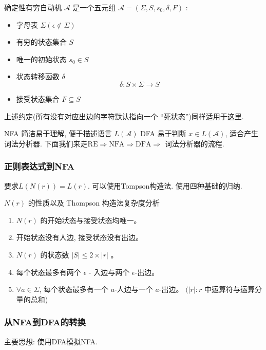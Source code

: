 \documentclass{ctexart}
\begin{document}
    \begin{definition}[DFA]
        确定性有穷自动机 $\mathcal{A}$ 是一个五元组 $\mathcal{A}=\left(\Sigma, S, s_0, \delta, F\right)$ :
        \begin{itemize}
            \item 字母表 $\Sigma(\epsilon \notin \Sigma)$
            \item 有穷的状态集合 $S$
            \item 唯一的初始状态 $s_0 \in S$
            \item 状态转移函数 $\delta$ 
            $$
            \delta: S \times \Sigma \rightarrow S
            $$
            \item 接受状态集合 $F \subseteq S$
        \end{itemize} 
        
    \end{definition}

    上述约定(所有没有对应出边的字符默认指向一个 “死状态”)同样适用于这里. 

    NFA 简洁易于理解, 便于描述语言 $L(\mathcal{A})$ DFA 易于判断 $x \in L(\mathcal{A})$, 适合产生词法分析器. 下面我们来走$\mathrm{RE} \Longrightarrow \mathrm{NFA} \Longrightarrow \mathrm{DFA} \Longrightarrow$ 词法分析器的流程. 

    \subsubsection{正则表达式到NFA}

    要求$L(N(r))=L(r)$. 可以使用Tompson构造法. 使用四种基础的归纳. 
        
    $N(r)$ 的性质以及 Thompson 构造法复杂度分析
\begin{enumerate}
    \item  $N(r)$ 的开始状态与接受状态均唯一。
    \item  开始状态没有人边, 接受状态没有出边。
    \item  $N(r)$ 的状态数 $|S| \leq 2 \times|r|$ 。
    \item  每个状态最多有两个 $\epsilon$ - 入边与两个 $\epsilon$-出边。
    \item  $\forall a \in \Sigma$, 每个状态最多有一个 $a$-人边与一个 $a$-出边。
    $(|r|: r$ 中运算符与运算分量的总和)
\end{enumerate}

\subsubsection{从NFA到DFA的转换} 主要思想: 使用DFA模拟NFA. 
\end{document}
